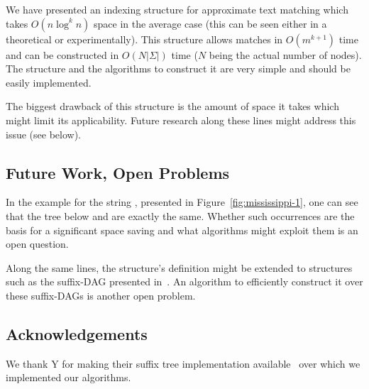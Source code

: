 We have presented an indexing structure for approximate text matching which takes $O(n\log^k n)$ space in the average case (this can be seen either in a theoretical or experimentally). This structure allows matches in $O(m^{k+1})$ time and can be constructed in $O(N|\Sigma|)$ time ($N$ being the actual number of nodes). The structure and the algorithms to construct it are very simple and should be easily implemented.

The biggest drawback of this structure is the amount of space it takes which might limit its applicability. Future research along these lines might address this issue (see below). 

\subsection{Future Work, Open Problems}\label{sec:future}

In the example for the string , presented in Figure~\ref{fig:mississippi-1}, one can see that the tree below  and  are exactly the same. Whether such occurrences are the basis for a significant space saving and what algorithms might exploit them is an open question.

Along the same lines, the structure's definition might be extended to structures such as the suffix-DAG presented in~\cite[7.7]{gusfield:algorithms}. An algorithm to efficiently construct it over these suffix-DAGs is another open problem.

\subsection{Acknowledgements}

We thank Y for making their suffix tree implementation available~\cite{} over which we implemented our algorithms.

